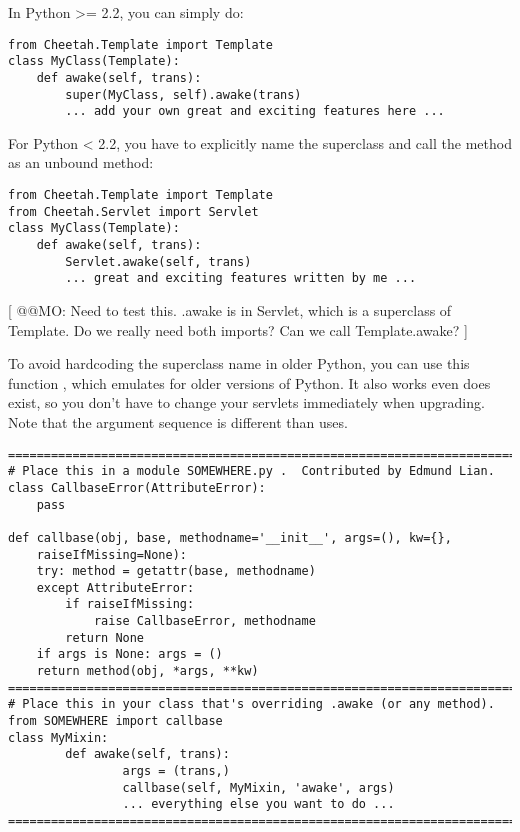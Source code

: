 In Python >= 2.2, you can simply do:
\begin{verbatim}
from Cheetah.Template import Template
class MyClass(Template):
	def awake(self, trans):
		super(MyClass, self).awake(trans)
		... add your own great and exciting features here ...
\end{verbatim}
For Python < 2.2, you have to explicitly name the superclass and call the
method as an unbound method:
\begin{verbatim}
from Cheetah.Template import Template
from Cheetah.Servlet import Servlet
class MyClass(Template):
	def awake(self, trans):
		Servlet.awake(self, trans)
		... great and exciting features written by me ...
\end{verbatim}

[ @@MO: Need to test this.  .awake is in Servlet, which is a superclass
of Template.  Do we really need both imports?  Can we call
Template.awake? ]

To avoid hardcoding the superclass name in older Python, you can use this
function , which emulates  for older versions of
Python.  It also works even  does exist, so you don't have to
change your servlets immediately when upgrading.  Note that the argument
sequence is different than  uses.

\begin{verbatim}
===========================================================================
# Place this in a module SOMEWHERE.py .  Contributed by Edmund Lian.
class CallbaseError(AttributeError):
    pass

def callbase(obj, base, methodname='__init__', args=(), kw={},
    raiseIfMissing=None):
    try: method = getattr(base, methodname)
    except AttributeError:
        if raiseIfMissing:
            raise CallbaseError, methodname
        return None
    if args is None: args = ()
    return method(obj, *args, **kw)
===========================================================================
# Place this in your class that's overriding .awake (or any method).
from SOMEWHERE import callbase
class MyMixin:
        def awake(self, trans):
                args = (trans,)
                callbase(self, MyMixin, 'awake', args)
                ... everything else you want to do ...
===========================================================================
\end{verbatim}


